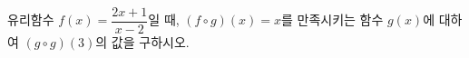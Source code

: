 유리함수 $f(x)=\dfrac{2x+1}{x-2}$일 때, $(f\circ g)(x)=x$를 만족시키는 함수 $g(x)$에 대하여 $(g\circ g)(3)$의 값을 구하시오.
